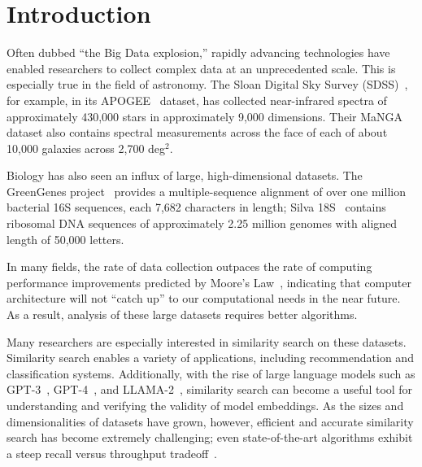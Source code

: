 \section{Introduction}
\label{sec:introduction}

Often dubbed ``the Big Data explosion,'' rapidly advancing technologies have enabled researchers to collect complex data at an unprecedented scale. 
This is especially true in the field of astronomy. 
The Sloan Digital Sky Survey (SDSS)~\cite{blanton2017sdss}, for example, in its APOGEE~\cite{alam2015eleventh} dataset, has collected near-infrared spectra of approximately 430,000 stars in approximately 9,000 dimensions. 
Their MaNGA dataset also contains spectral measurements across the face of each of about 10,000 galaxies across 2,700 deg$^2$. 

Biology has also seen an influx of large, high-dimensional datasets.
The GreenGenes project~\cite{desantis2006greengenes} provides a multiple-sequence alignment of over one million bacterial 16S sequences, each 7,682 characters in length;
Silva 18S~\cite{10.1093/nar/gks1219} contains ribosomal DNA sequences of approximately 2.25 million genomes with aligned length of 50,000 letters.


In many fields, the rate of data collection outpaces the rate of computing performance improvements predicted by Moore's Law~\cite{brescia2012extracting}, indicating that computer architecture will not ``catch up'' to our computational needs in the near future.
As a result, analysis of these large datasets requires better algorithms. 

Many researchers are especially interested in similarity search on these datasets. 
Similarity search enables a variety of applications, including recommendation and classification systems. 
Additionally, with the rise of large language models such as GPT-3~\cite{2020arXiv200514165B}, GPT-4~\cite{OpenAI2023GPT4TR}, and LLAMA-2~\cite{Touvron2023Llama2O}, similarity search can become a useful tool for understanding and verifying the validity of model embeddings. 
As the sizes and dimensionalities of datasets have grown, however, efficient and accurate similarity search has become extremely challenging; 
even state-of-the-art algorithms exhibit a steep recall versus throughput tradeoff~\cite{ishaq2019clustered}.


